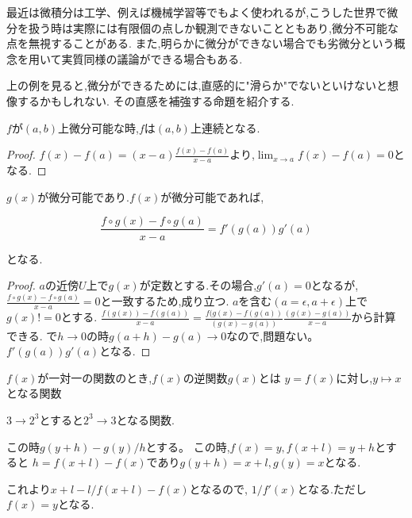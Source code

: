 \documentclass{ujarticle}
\begin{document}
\begin{rem}
最近は微積分は工学、例えば機械学習等でもよく使われるが,こうした世界で微分を扱う時は実際には有限個の点しか観測できないことともあり,微分不可能な点を無視することがある.
また,明らかに微分ができない場合でも劣微分という概念を用いて実質同様の議論ができる場合もある.
\end{rem}


上の例を見ると,微分ができるためには,直感的に"滑らか"でないといけないと想像するかもしれない.
その直感を補強する命題を紹介する.


\begin{prop}
$f$が$(a,b)$上微分可能な時,$f$は$(a,b)$上連続となる.
\end{prop}


\begin{proof}
$f(x) - f(a) = (x-a) \frac{f(x) - f(a)}{x -a}$より,$\lim_{x \to a}f(x) - f(a) = 0$となる.
\end{proof}


\begin{thm}[合成関数の微分]
  $g(x)$が微分可能であり.$f(x)$が微分可能であれば,

  \begin{equation*}
    \frac{f\circ g (x) - f\circ g (a)}{x-a} = f'(g(a))g'(a)
  \end{equation*}

となる.
\end{thm}

\begin{proof}
$a$の近傍$U$上で$g(x)$が定数とする.その場合,$g'(a) =0$となるが,
$\frac{f\circ g (x) - f\circ g (a)}{x-a} = 0$と一致するため,成り立つ.
$a$を含む$(a = \epsilon, a + \epsilon)$上で$g(x) != 0$とする.
$\frac{f(g(x)) - f(g(a))}{x- a} = \frac{f(g(x)-f(g(a))}{(g(x)-g(a))} \frac{(g(x)-g(a))}{x-a}$から計算できる.
で$h \to 0$の時$g(a+h) - g(a) \to 0$なので,問題ない。
$f'(g(a)) g'(a)$となる.
\end{proof}


\begin{dfn}
$f(x)$が一対一の関数のとき,$f(x)$の逆関数$g(x)$とは
$y = f(x)$に対し,$y \mapsto x$となる関数
\end{dfn}


\begin{epl}[指数関数と対数関数]
$3 \to 2^3$とすると$2^3 \to 3$となる関数.

この時$g(y+h) - g(y)/h$とする。
この時,$f(x) = y,f(x+l) = y+h$とすると
$h = f(x+l) - f(x)$であり$g(y+h) = x +l,g(y) = x$となる.

これより$x+l - l /f(x+l) - f(x)$となるので,
$1/f'(x)$となる.ただし$f(x) = y$となる.
\end{epl}
\end{document}
